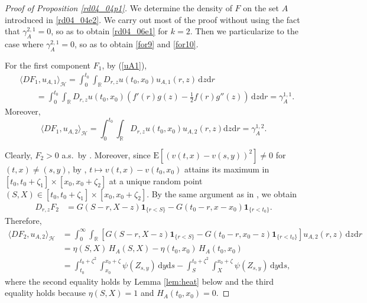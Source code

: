 \documentclass[12pt,a4paper]{article}
\newcommand{\R}{{\mathbb{R}}}
\newcommand{\E}{\mathrm{E}}
\newcommand{\HH}{\mathcal{H}}
\renewcommand{\d}{\mathrm{d}}
\newcommand {\deltah}{{\zeta}}
\newcommand{\<}{\langle}
\renewcommand{\>}{\rangle}
\begin{document}
 \begin{proof}[Proof of Proposition \ref{rd04_04p1}]
We determine the density of $F$ on the set $A$ introduced in \eqref{rd04_04e2}.  We carry out most of the proof without using the fact that $\gamma_A^{2, 1} = 0$, so as to obtain \eqref{rd04_06e1} for $k=2$. Then we particularize to the case where $\gamma_A^{2, 1} = 0$, so as to obtain \eqref{for9} and \eqref{for10}.
 
 
  
 For the first component $F_1$, by (\ref{uA1}),
 \begin{align} \nonumber
&  \langle DF_1, u_{A,1} \rangle_\HH =\int_0^{t_0}\int_\R D_{r,z} u(t_0,x_0) u_{A,1}(r, z)\, \d z \d r\\
  &\qquad=\int_0^{t_0}\int_\R D_{r,z} u(t_0,x_0) \label{for2}
 ( f'(r) g(z)- \frac 12f(r) g''(z) )\,  \d z \d r = \gamma_{A} ^{1,1}.
  \end{align}
   Moreover,
 \begin{equation} \label{for4a}
   \langle DF_1, u_{A,2} \rangle_\HH=
    \int_0^{t_0}\int_\R   D_{r,z} u(t_0,x_0) u_{A,2}(r,z) \d z \d r=  \gamma_{A} ^{1,2}.
    \end{equation}

Clearly, $F_2>0$ a.s.~by \cite[(3.9)]{Kho14}. Moreover, since $\E[(v(t,x)-v(s,y))^2]\neq 0$ for $(t,x)\neq (s,y)$,
 by \cite[Lemma 2.6]{KiP}, $t \mapsto v(t, x) - v(t_0, x_0)$ attains its maximum in $[t_0, t_0 + \deltah_1]\times[x_0, x_0 + \deltah_2]$ at a unique random point
 $(S,X)\in [t_0,t_0+\deltah_1]\times [x_0,x_0+\deltah_2]$.
  By the same argument as in \cite[Lemma 4.3]{DP1}, we obtain
 \begin{align*}
   D_{r,z} F_2 &= G(S-r,X-z) \mathbf{1}_{\{r<S\}}- G(t_0-r, x-x_0) \mathbf{1}_{\{r<t_0\}}.
 \end{align*}
Therefore,
 \begin{align*}
 \langle DF_2, u_{A,2} \rangle_\HH& = \int_0^{\infty}\int_\R\left[G(S-r, X-z)\bm{1}_{\{r<S\}} -  G(t_0-r, x_0-z)\bm{1}_{\{r<t_0\}} \right] u_{A,2}(r, z)\, \d z \d r\\
 &= \eta(S, X)\, H_A(S, X) - \eta(t_0, x_0)\, H_A(t_0, x_0) \\
 &= \int_{t_0}^{t_0+\deltah^2}\int_{x_0}^{x_0+\deltah}\psi(Z_{s,y})\, \d y\d s- \int_{S}^{t_0+\deltah^2}\int_{X}^{x_0+\deltah}\psi(Z_{s,y})\, \d y\d s,
 \end{align*}
 where the second equality holds by Lemma \ref{lem:heat} below and the third equality holds because $\eta(S, X) = 1$ and $H_A(t_0, x_0) = 0$. 
 

\end{proof}
\end{document}
